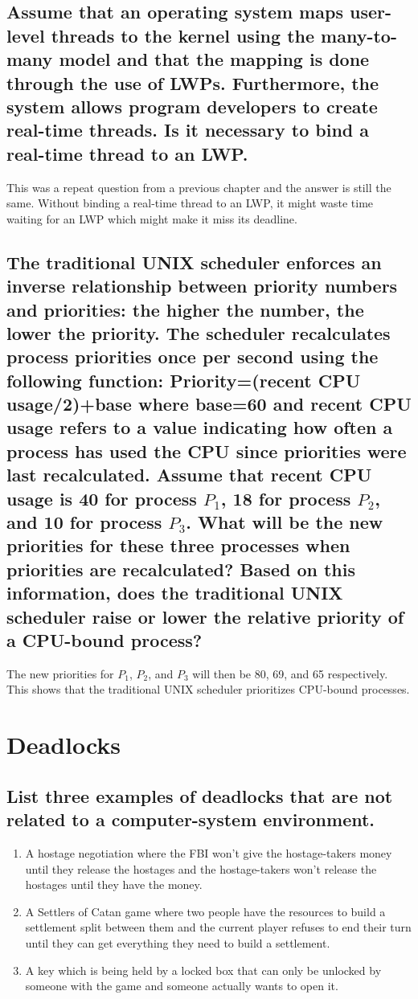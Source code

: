 \documentclass{book}%
\begin{document}
\section{Assume that an operating system maps user-level threads to the kernel
using the many-to-many model and that the mapping is done through the use of
LWPs. Furthermore, the system allows program developers to create real-time
threads. Is it necessary to bind a real-time thread to an LWP.}
This was a repeat question from a previous chapter and the answer is still the
same. Without binding a real-time thread to an LWP, it might waste time waiting
for an LWP which might make it miss its deadline.
\section{The traditional UNIX scheduler enforces an inverse relationship between
priority numbers and priorities: the higher the number, the lower the priority.
The scheduler recalculates process priorities once per second using the 
following function: Priority=(recent CPU usage/2)+base where base=60 and recent
CPU usage refers to a value indicating how often a process has used the CPU
since priorities were last recalculated. Assume that recent CPU usage is 40 for
process $P_1$, 18 for process $P_2$, and 10 for process $P_3$. What will be the
new priorities for these three processes when priorities are recalculated? Based
on this information, does the traditional UNIX scheduler raise or lower the 
relative priority of a CPU-bound process?}
The new priorities for $P_1$, $P_2$, and $P_3$ will then be 80, 69, and 65 
respectively. This shows that the traditional UNIX scheduler prioritizes 
CPU-bound processes.
\chapter{Deadlocks}
\section{List three examples of deadlocks that are not related to a 
computer-system environment.}
\begin{enumerate}
\item A hostage negotiation where the FBI won't give the hostage-takers money
until they release the hostages and the hostage-takers won't release the
hostages until they have the money.
\item A Settlers of Catan game where two people have the resources to build a
settlement split between them and the current player refuses to end their turn
until they can get everything they need to build a settlement.
\item A key which is being held by a locked box that can only be unlocked by
someone with the game and someone actually wants to open it.
\end{enumerate}
\end{document}
